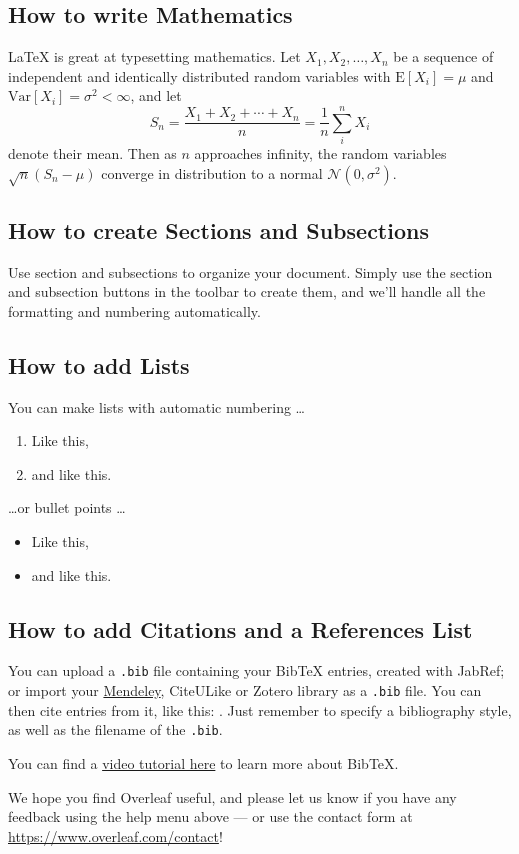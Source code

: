 \documentclass[a4paper]{article}
\begin{document}
\subsection{How to write Mathematics}

\LaTeX{} is great at typesetting mathematics. Let $X_1, X_2, \ldots, X_n$ be a sequence of independent and identically distributed random variables with $\text{E}[X_i] = \mu$ and $\text{Var}[X_i] = \sigma^2 < \infty$, and let
\[S_n = \frac{X_1 + X_2 + \cdots + X_n}{n}
      = \frac{1}{n}\sum_{i}^{n} X_i\]
denote their mean. Then as $n$ approaches infinity, the random variables $\sqrt{n}(S_n - \mu)$ converge in distribution to a normal $\mathcal{N}(0, \sigma^2)$.


\subsection{How to create Sections and Subsections}

Use section and subsections to organize your document. Simply use the section and subsection buttons in the toolbar to create them, and we'll handle all the formatting and numbering automatically.

\subsection{How to add Lists}

You can make lists with automatic numbering \dots

\begin{enumerate}
\item Like this,
\item and like this.
\end{enumerate}
\dots or bullet points \dots
\begin{itemize}
\item Like this,
\item and like this.
\end{itemize}

\subsection{How to add Citations and a References List}

You can upload a \verb|.bib| file containing your BibTeX entries, created with JabRef; or import your \href{https://www.overleaf.com/blog/184}{Mendeley}, CiteULike or Zotero library as a \verb|.bib| file. You can then cite entries from it, like this: \cite{greenwade93}. Just remember to specify a bibliography style, as well as the filename of the \verb|.bib|.

You can find a \href{https://www.overleaf.com/help/97-how-to-include-a-bibliography-using-bibtex}{video tutorial here} to learn more about BibTeX.

We hope you find Overleaf useful, and please let us know if you have any feedback using the help menu above --- or use the contact form at \url{https://www.overleaf.com/contact}!



\end{document}
